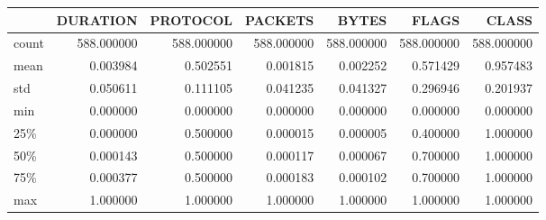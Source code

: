 \begin{tabular}{lrrrrrr}
\toprule
{} &    DURATION &    PROTOCOL &     PACKETS &       BYTES &       FLAGS &       CLASS \\
\midrule
count &  588.000000 &  588.000000 &  588.000000 &  588.000000 &  588.000000 &  588.000000 \\
mean  &    0.003984 &    0.502551 &    0.001815 &    0.002252 &    0.571429 &    0.957483 \\
std   &    0.050611 &    0.111105 &    0.041235 &    0.041327 &    0.296946 &    0.201937 \\
min   &    0.000000 &    0.000000 &    0.000000 &    0.000000 &    0.000000 &    0.000000 \\
25\%   &    0.000000 &    0.500000 &    0.000015 &    0.000005 &    0.400000 &    1.000000 \\
50\%   &    0.000143 &    0.500000 &    0.000117 &    0.000067 &    0.700000 &    1.000000 \\
75\%   &    0.000377 &    0.500000 &    0.000183 &    0.000102 &    0.700000 &    1.000000 \\
max   &    1.000000 &    1.000000 &    1.000000 &    1.000000 &    1.000000 &    1.000000 \\
\bottomrule
\end{tabular}
